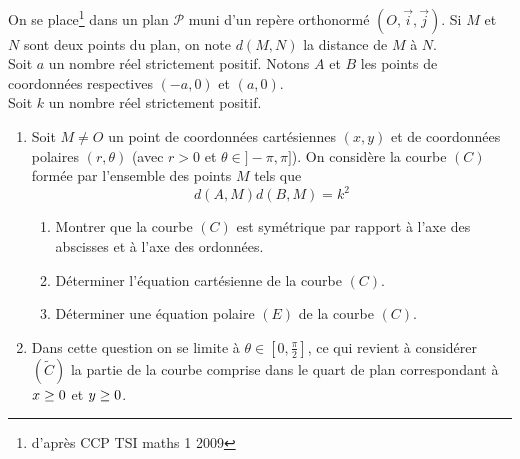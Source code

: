 On se place\footnote{d'après CCP TSI maths 1 2009} dans un plan $\mathcal P$ muni d'un repère orthonormé $(O,\vec{i},\vec{j})$.
Si $M$ et $N$ sont deux points du plan, on note $d(M,N)$ la distance de $M$ à $N$.\\
Soit $a$ un nombre réel strictement positif. Notons $A$ et $B$ les points de coordonnées respectives $(-a,0)$ et $(a,0)$.\\
Soit $k$ un nombre réel strictement positif.
\begin{enumerate}
\item Soit $M\neq O$ un point de coordonnées cartésiennes $(x,y)$ et de coordonnées polaires $(r,\theta)$ (avec $r>0$ et $\theta\in ]-\pi,\pi]$). On considère la courbe $(C)$ formée par l'ensemble des points $M$ tels que $$d(A,M)d(B,M)=k^2$$
\begin{enumerate}
\item Montrer que la courbe $(C)$ est symétrique par rapport à l'axe des abscisses et à l'axe des ordonnées.
\item Déterminer l'équation cartésienne de la courbe $(C)$.
\item Déterminer une équation polaire $(E)$ de la courbe $(C)$.
\end{enumerate}
\item Dans cette question on se limite à $\theta \in \left[ 0,\frac{\pi}{2} \right] $, ce qui revient à considérer $(\tilde{C})$ la partie de la courbe comprise dans le quart de plan correspondant à $x\geq 0$ et $y\geq 0$.
   

\end{enumerate}
